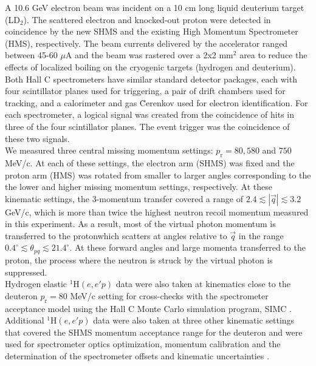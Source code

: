 \indent A 10.6 GeV electron beam was incident on a 10 cm long liquid deuterium target (LD$_{2}$). The scattered electron and knocked-out proton were detected in coincidence
by the new SHMS and the existing High Momentum Spectrometer (HMS), respectively. The beam currents delivered by the accelerator ranged between 45-60 $\mu$A and the beam was rastered over a 2x2 mm$^{2}$ area to reduce the effects of localized boiling on the cryogenic targets (hydrogen and deuterium).\\
\indent Both Hall C spectrometers have similar standard detector packages, each with four scintillator planes \cite{hodo_techreport} used for triggering, a pair of drift chambers \cite{dc_techreport} used for tracking, and a calorimeter \cite{Mkrtchyan_2013} and gas \u{C}erenkov \cite{Li_Wenliang_mthesis,ngc_techreport} used for electron identification.
For each spectrometer, a logical \DIFdelbegin {}\DIFdelend signal was created from  the coincidence of hits in three of the four scintillator planes. The event trigger was the coincidence of these two signals. \\
\indent We measured three central missing momentum settings: $p_{\mathrm{r}}=80, 580$ and $750$ MeV/c. At each of these settings, the electron arm (SHMS) was fixed and the proton arm (HMS) was rotated from smaller to larger angles corresponding to the
the lower and higher missing momentum settings, respectively. At these kinematic settings, the 3-momentum transfer covered a range of $2.4\lesssim|\vec{q}|\lesssim3.2$ GeV/c, which is more than twice the highest neutron recoil momentum
measured in this experiment. As a result, most of the virtual photon momentum is transferred to the proton\DIFaddbegin \DIFadd{, }\DIFaddend which scatters at angles relative to $\vec{q}$ in the range $0.4^{\circ}\lesssim \theta_{pq}\lesssim21.4^{\circ}$.
At these forward angles and large momenta transferred to the proton, the  process where the neutron is struck by the virtual photon is suppressed.\\
\indent Hydrogen elastic $^{1}\mathrm{H}(e,e'p)$ data were also taken at kinematics close to the deuteron $p_{\mathrm{r}}=80$ MeV/c setting for cross-checks with the spectrometer acceptance model using the  Hall C Monte Carlo
simulation program, SIMC \cite{PhysRevC.64.054610}. Additional $^{1}\mathrm{H}(e,e'p)$ data were also taken at three other kinematic settings that covered the SHMS momentum acceptance range for the deuteron and were used for spectrometer optics optimization, 
momentum calibration and the determination of the spectrometer offsets and kinematic uncertainties \cite{cyero_phdthesis}.\\
